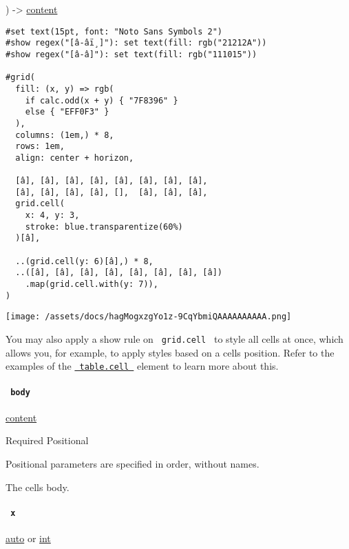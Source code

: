 ) -\textgreater{} \href{/docs/reference/foundations/content/}{content}

\begin{verbatim}
#set text(15pt, font: "Noto Sans Symbols 2")
#show regex("[â-âï¸]"): set text(fill: rgb("21212A"))
#show regex("[â-â]"): set text(fill: rgb("111015"))

#grid(
  fill: (x, y) => rgb(
    if calc.odd(x + y) { "7F8396" }
    else { "EFF0F3" }
  ),
  columns: (1em,) * 8,
  rows: 1em,
  align: center + horizon,

  [â], [â], [â], [â], [â], [â], [â], [â],
  [â], [â], [â], [â], [],  [â], [â], [â],
  grid.cell(
    x: 4, y: 3,
    stroke: blue.transparentize(60%)
  )[â],

  ..(grid.cell(y: 6)[â],) * 8,
  ..([â], [â], [â], [â], [â], [â], [â], [â])
    .map(grid.cell.with(y: 7)),
)
\end{verbatim}

\texttt{[image: /assets/docs/hagMogxzgYo1z-9CqYbmiQAAAAAAAAAA.png]}

You may also apply a show rule on \texttt{\ grid.cell\ } to style all
cells at once, which allows you, for example, to apply styles based on a
cell\textquotesingle s position. Refer to the examples of the
\href{/docs/reference/model/table/\#definitions-cell}{\texttt{\ table.cell\ }}
element to learn more about this.

\paragraph{\texorpdfstring{\texttt{\ body\ }}{ body }}\label{definitions-cell-body}

\href{/docs/reference/foundations/content/}{content}

{Required} {{ Positional }}

\label{definitions-cell-body-positional-tooltip}
Positional parameters are specified in order, without names.

The cell\textquotesingle s body.

\paragraph{\texorpdfstring{\texttt{\ x\ }}{ x }}\label{definitions-cell-x}

\href{/docs/reference/foundations/auto/}{auto} {or}
\href{/docs/reference/foundations/int/}{int}

